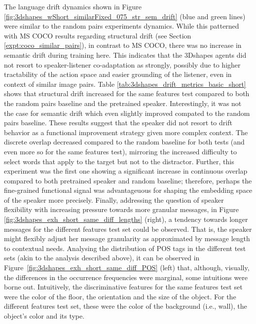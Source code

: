 The language drift dynamics shown in Figure \ref{fig:3dshapes_wShort_similarFixed_075_str_sem_drift} (blue and green lines) were similar to the random pairs experiments dynamics. While this patterned with MS COCO results regarding structural drift (see Section \ref{expt:coco_similar_pairs}), in contrast to MS COCO, there was no increase in semantic drift during training here. This indicates that the 3Dshapes agents did not resort to speaker-listener co-adaptation as strongly, possibly due to higher tractability of the action space and easier grounding of the listener, even in context of similar image pairs.
Table \ref{tab:3dshapes_drift_metrics_basic_short} shows that structural drift increased for the same features test compared to both the random pairs baseline and the pretrained speaker. Interestingly, it was not the case for semantic drift which even slightly improved compated to the random pairs baseline. These results suggest that the speaker did not resort to drift behavior as a functional improvement strategy given more complex context. The discrete overlap decreased compared to the random baseline for both tests (and even more so for the same features test), mirroring the increased difficulty to select words that apply to the target but not to the distractor. Further, this experiment was the first one showing a significant increase in continuous overlap compared to both pretrained speaker and random baseline; therefore, perhaps the fine-grained functional signal was advantageuous for shaping the embedding space of the speaker more precisely. Finally, addressing the question of speaker flexibility with increasing pressure towards more granular messages, in Figure \ref{fig:3dshapes_exh_short_same_diff_lengths} (right), a tendency towards longer messages for the different features test set could be observed. That is, the speaker might flexibly adjust her message granularity as approximated by message length to contextual needs.  %
Analysing the distribution of POS tags in the different test sets (akin to the analysis described above), it can be observed in Figure~\ref{fig:3dshapes_exh_short_same_diff_POS} (left) that, although, visually, the differences in the occurrence frequencies were marginal, some intuitions were borne out. Intuitively, the discriminative features for the same features test set were the color of the floor, the orientation and the size of the object. For the different features test set, these were the color of the background (i.e., wall), the object's color and its type.
